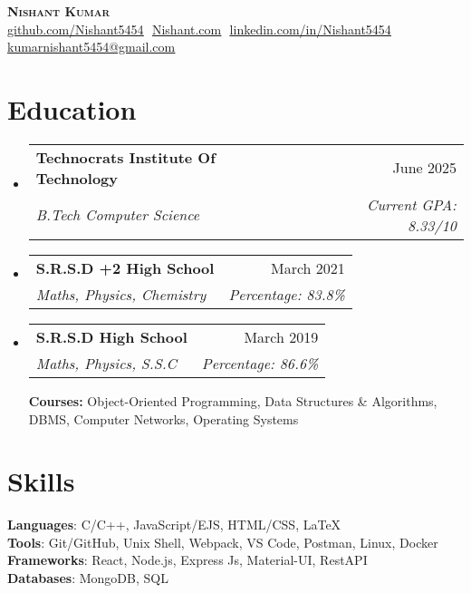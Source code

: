 \documentclass[letterpaper,10pt]{article}
\makeatletter
\newcommand{\resumeSubheading}[4]{
  \vspace{-2pt}\item
    \begin{tabular*}{0.97\textwidth}[t]{l@{\extracolsep{\fill}}r}
      \textbf{#1} & #2 \\
      \textit{\small#3} & \textit{\small #4} \\
    \end{tabular*}\vspace{-7pt}
}
\newcommand{\resumeSubHeadingListStart}{\begin{itemize}[leftmargin=0.15in, label={}]}
\newcommand{\resumeSubHeadingListEnd}{\end{itemize}}
\makeatother
\begin{document}
\begin{center}
    \textbf{\Huge \scshape Nishant Kumar} \\ \vspace{8pt}
    \small 
    \href{https://github.com/Nishant5454}{\underline{github.com/Nishant5454}} $  $
    \href{https://www.mattydoe.com}
    {\underline{Nishant.com}} $  $
    \href{https://www.linkedin.com/feed/}{\underline{linkedin.com/in/Nishant5454}} $  $
    \href{mailto:kumarnishant5454@gmail.com}
    {\underline{kumarnishant5454@gmail.com}}
\end{center}

\section{Education}
  \resumeSubHeadingListStart
  
    \resumeSubheading
      {Technocrats Institute Of Technology}{June 2025}
      {B.Tech Computer Science}{Current GPA: 8.33/10}  
      
    \resumeSubheading
      {S.R.S.D +2 High School}{March 2021}
      {Maths, Physics, Chemistry}{Percentage: 83.8\%} 
      
    \resumeSubheading 
      {S.R.S.D High School}{March 2019} 
      {Maths, Physics, S.S.C}{Percentage: 86.6\%}

    \vspace{-5pt}

    \textbf{Courses:} Object-Oriented Programming, Data Structures \& Algorithms, DBMS, Computer Networks, Operating Systems

  \resumeSubHeadingListEnd

\section{Skills}
 \begin{itemize}[leftmargin=0.15in, label={}]
    \small{\item{
     \textbf{Languages}{: C/C++, JavaScript/EJS, HTML/CSS, \LaTeX} \\
     \textbf{Tools}{: Git/GitHub, Unix Shell, Webpack, VS Code, Postman, Linux, Docker} \\
     \textbf{Frameworks}{: React, Node.js, Express Js, Material-UI, RestAPI} \\
     \textbf{Databases}{: MongoDB, SQL}
    }}
 \end{itemize}
\end{document}
